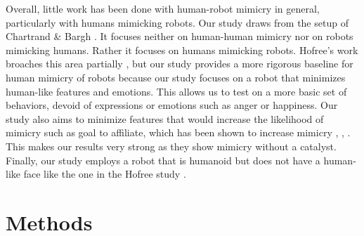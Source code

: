 \documentclass{acm_proc_article-sp}
\begin{document}
Overall, little work has been done with human-robot mimicry in general, particularly with humans mimicking robots. Our study draws from the setup of Chartrand \& Bargh \cite{chartrand1999chameleon}. It focuses neither on human-human mimicry nor on robots mimicking humans. Rather it focuses on humans mimicking robots. Hofree's work broaches this area partially \cite{hofree2014bridging}, but our study provides a more rigorous baseline for human mimicry of robots because our study focuses on a robot that minimizes human-like features and emotions. This allows us to test on a more basic set of behaviors, devoid of expressions or emotions such as anger or happiness. Our study also aims to minimize features that would increase the likelihood of mimicry such as goal to affiliate, which has been shown to increase mimicry \cite{chartrand2013antecedents}, \cite{drury2006effects}, \cite{lakin2003using}. This makes our results very strong as they show mimicry without a catalyst. Finally, our study employs a robot that is humanoid but does not have a human-like face like the one in the Hofree study \cite{hofree2014bridging}.

\section{Methods} 
\end{document}
